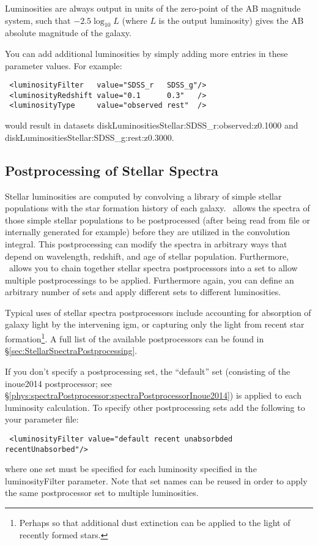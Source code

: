 Luminosities are always output in units of the zero-point of the AB magnitude system, such that $-2.5\log_{10}L$ (where $L$ is the output luminosity) gives the AB absolute magnitude of the galaxy.

You can add additional luminosities by simply adding more entries in these parameter values. For example:
\begin{verbatim}
 <luminosityFilter   value="SDSS_r   SDSS_g"/>
 <luminosityRedshift value="0.1      0.3"   />
 <luminosityType     value="observed rest"  />
\end{verbatim}
would result in datasets {\normalfont \ttfamily diskLuminositiesStellar:SDSS\_r:observed:z0.1000} and {\normalfont \ttfamily diskLuminositiesStellar:SDSS\_g:rest:z0.3000}. 

\subsection{Postprocessing of Stellar Spectra}

Stellar luminosities are computed by convolving a library of simple stellar populations with the star formation history of each galaxy. \glc\ allows the spectra of those simple stellar populations to be postprocessed (after being read from file or internally generated for example) before they are utilized in the convolution integral. This postprocessing can modify the spectra in arbitrary ways that depend on wavelength, redshift, and age of stellar population. Furthermore, \glc\ allows you to chain together stellar spectra postprocessors into a set to allow multiple postprocessings to be applied. Furthermore again, you can define an arbitrary number of sets and apply different sets to different luminosities.

Typical uses of stellar spectra postprocessors include accounting for absorption of galaxy light by the intervening \gls{igm}, or capturing only the light from recent star formation\footnote{Perhaps so that additional dust extinction can be applied to the light of recently formed stars.}. A full list of the available postprocessors can be found in \S\ref{sec:StellarSpectraPostprocessing}.

If you don't specify a postprocessing set, the ``default'' set (consisting of the {\normalfont \ttfamily inoue2014} postprocessor; see \S\ref{phys:spectraPostprocessor:spectraPostprocessorInoue2014}) is applied to each luminosity calculation. To specify other postprocessing sets add the following to your parameter file:
\begin{verbatim}
 <luminosityFilter value="default recent unabsorbded recentUnabsorbed"/>
\end{verbatim}
where one set must be specified for each luminosity specified in the {\normalfont \ttfamily luminosityFilter} parameter. Note that set names can be reused in order to apply the same postprocessor set to multiple luminosities.

